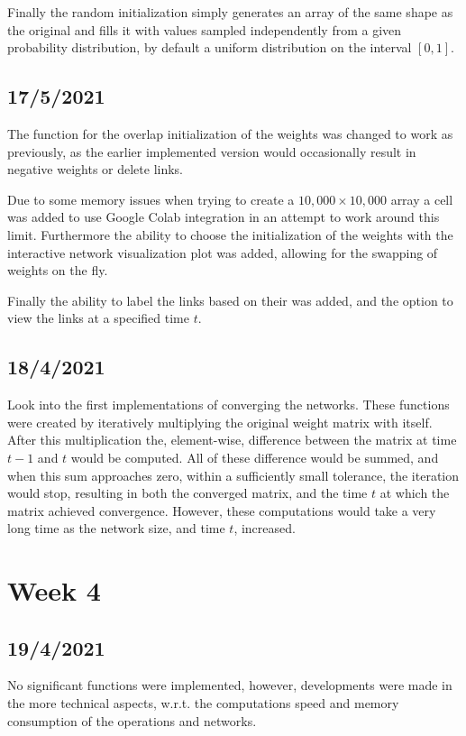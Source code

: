 \documentclass{article}
\begin{document}
Finally the random initialization simply generates an array of the same shape as the original and fills it with values sampled independently from a given probability distribution, by default a uniform distribution on the interval $[0, 1]$.

\subsection{17/5/2021}
The function for the overlap initialization of the weights was changed to work as previously, as the earlier implemented version would occasionally result in negative weights or delete links.

Due to some memory issues when trying to create a $10,000 \times 10,000$ array a cell was added to use Google Colab integration in an attempt to work around this limit. Furthermore the ability to choose the initialization of the weights with the interactive network visualization plot was added, allowing for the swapping of weights on the fly.

Finally the ability to label the links based on their was added, and the option to view the links at a specified time $t$.

\subsection{18/4/2021}
Look into the first implementations of converging the networks. These functions were created by iteratively multiplying the original weight matrix with itself. After this multiplication the, element-wise, difference between the matrix at time $t-1$ and $t$ would be computed. All of these difference would be summed, and when this sum approaches zero, within a sufficiently small tolerance, the iteration would stop, resulting in both the converged matrix, and the time $t$ at which the matrix achieved convergence. However, these computations would take a very long time as the network size, and time $t$, increased.

\newpage

\section{Week 4}
\subsection{19/4/2021}
No significant functions were implemented, however, developments were made in the more technical aspects, w.r.t. the computations speed and memory consumption of the operations and networks.
\end{document}
